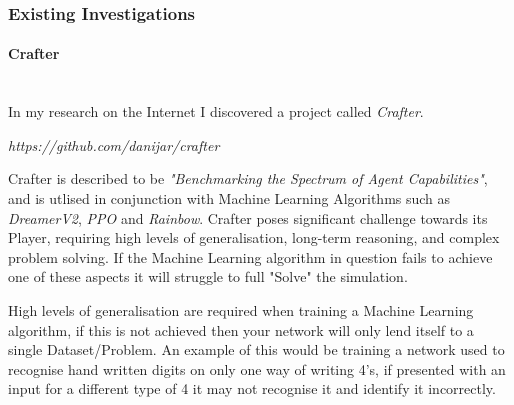\begin{flushleft}
\begin{enumerate}
                    \vspace{0.5cm}
                \end{enumerate}
                \subsubsection{Existing Investigations} 
                    \paragraph{Crafter} \mbox{} \\
                        \vspace{0.2cm}
                            In my research on the Internet I discovered a project called \textit{Crafter}. \\

                            \vspace{0.2cm}
                            \centerline{\textit{https://github.com/danijar/crafter}}
                            \vspace{0.2cm}

                            Crafter is described to be \textit{"Benchmarking the Spectrum of Agent Capabilities"}, and is utlised
                            in conjunction with Machine Learning Algorithms such as \textit{DreamerV2}, \textit{PPO} and \textit{Rainbow}. Crafter poses significant
                            challenge towards its Player, requiring high levels of generalisation, long-term reasoning, and complex 
                            problem solving. If the Machine Learning algorithm in question fails to achieve one of these aspects it will 
                            struggle to full "Solve" the simulation. \\

                            \vspace{0.2cm}

                            High levels of generalisation are required when training a Machine Learning algorithm, if this is not achieved then
                            your network will only lend itself to a single Dataset/Problem. An example of this would be training a network used
                            to recognise hand written digits on only one way of writing 4's, if presented with an input for a different type of 
                            4 it may not recognise it and identify it incorrectly. \\
                            

\end{flushleft}

